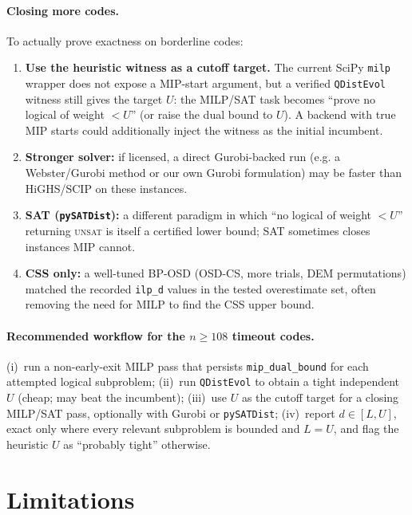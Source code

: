 \documentclass[11pt]{article}
\newcommand{\tablecmd}[1]{\texttt{#1}}
\begin{document}
\paragraph{Closing more codes.} To actually prove exactness on borderline codes:
\begin{enumerate}
  \item \textbf{Use the heuristic witness as a cutoff target.} The current SciPy
  \texttt{milp} wrapper does not expose a MIP-start argument, but a verified
  \texttt{QDistEvol} witness still gives the target $U$: the MILP/SAT task becomes
  ``prove no logical of weight $<U$'' (or raise the dual bound to $U$). A backend
  with true MIP starts could additionally inject the witness as the initial
  incumbent.
  \item \textbf{Stronger solver:} if licensed, a direct Gurobi-backed run (e.g. a
  Webster/Gurobi method or our own Gurobi formulation) may be faster than
  HiGHS/SCIP on these instances.
  \item \textbf{SAT (\texttt{pySATDist}):} a different paradigm in which ``no
  logical of weight $<U$'' returning \textsc{unsat} is itself a certified lower
  bound; SAT sometimes closes instances MIP cannot.
  \item \textbf{CSS only:} a well-tuned BP-OSD (OSD-CS, more trials, DEM
  permutations) matched the recorded \texttt{ilp\_d} values in the tested
  overestimate set, often removing the need for MILP to find the CSS upper bound.
\end{enumerate}

\paragraph{Recommended workflow for the $n\ge108$ timeout codes.}
(i)~run a non-early-exit MILP pass that persists \tablecmd{mip\_dual\_bound} for
each attempted logical subproblem; (ii)~run \texttt{QDistEvol} to obtain a tight
independent $U$ (cheap; may beat the incumbent); (iii)~use $U$ as the cutoff target
for a closing MILP/SAT pass, optionally with Gurobi or \texttt{pySATDist};
(iv)~report $d\in[L,U]$, exact only where every relevant subproblem is bounded and
$L=U$, and flag the heuristic $U$ as ``probably tight'' otherwise.

\section{Limitations}
\end{document}
